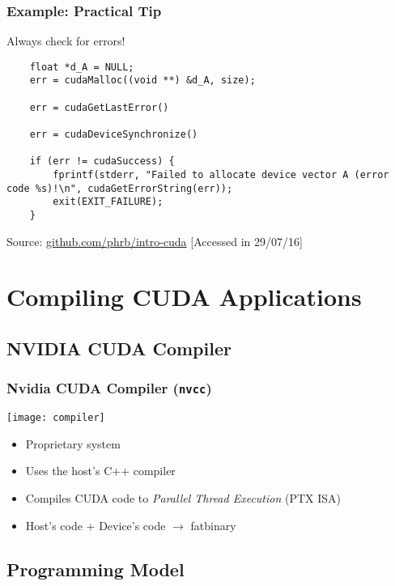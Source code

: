 \documentclass[10pt, compress]{beamer}
\begin{document}
\begin{frame}[fragile]
    \frametitle{Example: Practical Tip}
    \alert{Always} check for errors!

    \begin{lstlisting}
    float *d_A = NULL;
    err = cudaMalloc((void **) &d_A, size);

    err = cudaGetLastError()

    err = cudaDeviceSynchronize()

    if (err != cudaSuccess) {
        fprintf(stderr, "Failed to allocate device vector A (error code %s)!\n", cudaGetErrorString(err));
        exit(EXIT_FAILURE);
    }
    \end{lstlisting}

    \begin{center}
        \tiny{Source: \url{github.com/phrb/intro-cuda} [Accessed in 29/07/16]}
    \end{center}
\end{frame}

\section{Compiling CUDA Applications}

\subsection{NVIDIA CUDA Compiler}

\begin{frame}
    \frametitle{Nvidia CUDA Compiler (\texttt{nvcc})}
    \begin{center}
        \texttt{[image: compiler]}
    \end{center}

    \begin{itemize}
        \item \alert{Proprietary} system

        \item Uses the host's C++ compiler

        \item Compiles CUDA code to \textit{Parallel Thread Execution} (\alert{PTX} ISA)

        \item Host's code + Device's code $\rightarrow$ \alert{fatbinary}
    \end{itemize}
\end{frame}

\subsection{Programming Model}
\end{document}
